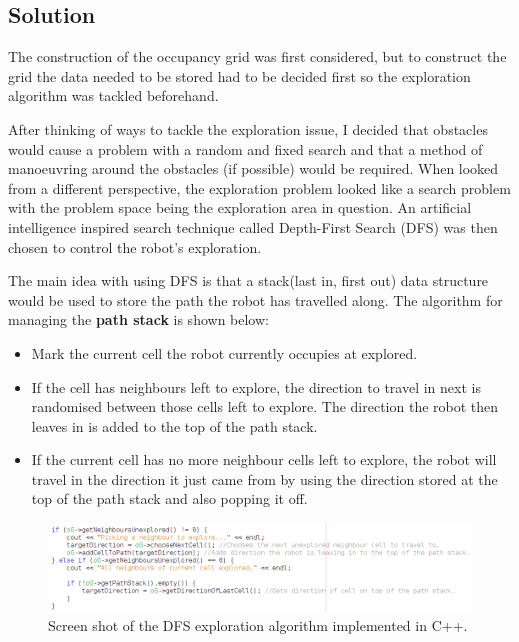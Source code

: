 \documentclass[a4paper,12pt]{article}
\begin{document}
\subsection{Solution}
\noindent The construction of the occupancy grid was first considered, but to construct the grid the data needed to be stored had to be decided first so the exploration algorithm was tackled beforehand.

\vspace{5mm}
\noindent After thinking of ways to tackle the exploration issue, I decided that obstacles would cause a problem with a random and fixed search and that a method of manoeuvring around the obstacles (if possible) would be required. When looked from a different perspective, the exploration problem looked like a search problem with the problem space being the exploration area in question. An artificial intelligence inspired search technique called Depth-First Search (DFS) was then chosen to control the robot's exploration.

\vspace{5mm}
\noindent The main idea with using DFS is that a stack(last in, first out) data structure would be used to store the path the robot has travelled along. The algorithm for managing the \textbf{path stack} is shown below:

\begin{itemize}
	\item Mark the current cell the robot currently occupies at explored.
	\item If the cell has neighbours left to explore, the direction to travel in next is randomised between those cells left to explore. The direction the robot then leaves in is added to the top of the path stack.
	\item If the current cell has no more neighbour cells left to explore, the robot will travel in the direction it just came from by using the direction stored at the top of the path stack and also popping it off.
\end{itemize}

\begin{figure}[H]
\includegraphics[scale=0.53]{roboticsDFSCode.png}
\caption{Screen shot of the DFS exploration algorithm implemented in C++.}
\end{figure}
\end{document}
